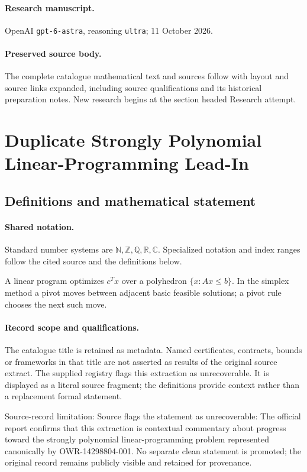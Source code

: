 \documentclass[11pt]{article}
\begin{document}
\paragraph{Research manuscript.} OpenAI \texttt{gpt-6-astra}, reasoning \texttt{ultra}; 11 October 2026.
\paragraph{Preserved source body.} The complete catalogue mathematical text and sources follow with layout and source links expanded, including source qualifications and its historical preparation notes. New research begins at the section headed Research attempt.

\section{Duplicate Strongly Polynomial Linear-Programming Lead-In}\label{statement}

\subsection{Definitions and mathematical statement}

\paragraph{Shared notation.}Standard number systems are $\mathbb N,\mathbb Z,\mathbb Q,\mathbb R,\mathbb C$. Specialized notation and index ranges follow the cited source and the definitions below.


A linear program optimizes $c^Tx$ over a polyhedron $\{x:Ax\leq b\}$. In the simplex method a pivot moves between adjacent basic feasible solutions; a pivot rule chooses the next such move.
\paragraph{Record scope and qualifications.}
The catalogue title is retained as metadata. Named certificates, contracts, bounds or frameworks in that title are not asserted as results of the original source extract.
The supplied registry flags this extraction as unrecoverable. It is displayed as a literal source fragment; the definitions provide context rather than a replacement formal statement.

Source-record limitation: Source flags the statement as unrecoverable: The official report confirms that this extraction is contextual commentary about progress toward the strongly polynomial linear-programming problem represented canonically by OWR-14298804-001. No separate clean statement is promoted; the original record remains publicly visible and retained for provenance.
\end{document}

